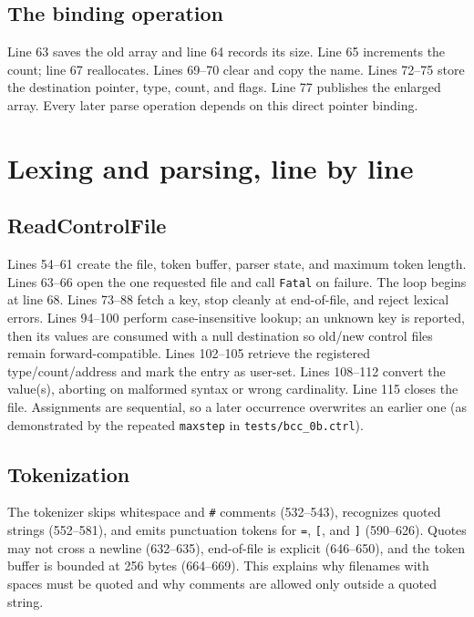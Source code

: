 \documentclass[11pt]{article}
\newcommand{\code}[1]{\texorpdfstring{\nolinkurl{#1}}{#1}}
\begin{document}
\subsection{The binding operation}

Line 63 saves the old array and line 64 records its size. Line 65 increments the count; line 67 reallocates. Lines 69--70 clear and copy the name. Lines 72--75 store the destination pointer, type, count, and flags. Line 77 publishes the enlarged array. Every later parse operation depends on this direct pointer binding.

\section{Lexing and parsing, line by line}
\subsection{ReadControlFile}

Lines 54--61 create the file, token buffer, parser state, and maximum token length. Lines 63--66 open the one requested file and call \code{Fatal} on failure. The loop begins at line 68. Lines 73--88 fetch a key, stop cleanly at end-of-file, and reject lexical errors. Lines 94--100 perform case-insensitive lookup; an unknown key is reported, then its values are consumed with a null destination so old/new control files remain forward-compatible. Lines 102--105 retrieve the registered type/count/address and mark the entry as user-set. Lines 108--112 convert the value(s), aborting on malformed syntax or wrong cardinality. Line 115 closes the file. Assignments are sequential, so a later occurrence overwrites an earlier one (as demonstrated by the repeated \code{maxstep} in \code{tests/bcc_0b.ctrl}).

\subsection{Tokenization}

The tokenizer skips whitespace and \code{\#} comments (532--543), recognizes quoted strings (552--581), and emits punctuation tokens for \code{=}, \code{[}, and \code{]} (590--626). Quotes may not cross a newline (632--635), end-of-file is explicit (646--650), and the token buffer is bounded at 256 bytes (664--669). This explains why filenames with spaces must be quoted and why comments are allowed only outside a quoted string.
\end{document}
